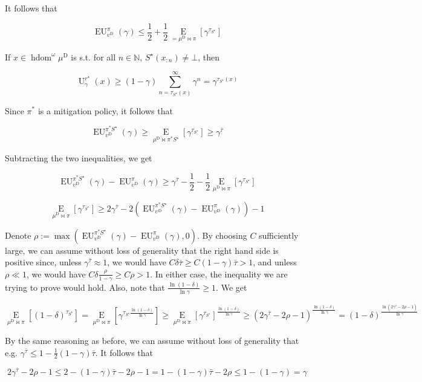 \documentclass[a4paper]{article}
\newcommand{\AP}[1]{\left(#1\right)}
\newcommand{\AB}[1]{\left[#1\right]}
\newcommand{\Ea}[2]{\underset{#1}{\operatorname{E}}\AB{#2}}
\newcommand{\Nats}{\mathbb{N}}
\DeclareMathOperator{\HD}{hdom}
\newcommand{\RMD}{\mathrm{D}}
\newcommand{\UD}{\upsilon^{\RMD}}
\newcommand{\Ut}{\operatorname{U}}
\newcommand{\EU}{\operatorname{EU}}
\begin{document}
It follows that

$$\EU_{\UD}^\pi(\gamma) \leq \frac{1}{2}+\frac{1}{2}\Ea{=\mu^\RMD\bowtie\pi}{\gamma^{\tau_{S^\star}}}$$

If $x \in \HD^\omega{\mu^\RMD}$ is s.t. for all $n\in\Nats$, $S^\star\AP{x_{:n}}\ne\bot$, then

$$\Ut^{r^\star}_\gamma(x) \geq (1-\gamma)\sum_{n=\tau_{S^\star}(x)}^\infty \gamma^n = \gamma^{\tau_{S^\star}(x)}$$

Since $\pi^*$ is a mitigation policy, it follows that

$$\EU_{\UD}^{\pi^*S^\star}(\gamma) \geq \Ea{\mu^\RMD\bowtie\pi^*S^\star}{\gamma^{\tau_{S^\star}}} \geq \gamma^{\bar{\tau}}$$

Subtracting the two inequalities, we get

$$\EU_{\UD}^{\pi^*S^\star}(\gamma) - \EU_{\UD}^\pi(\gamma) \geq \gamma^{\bar{\tau}} - \frac{1}{2} - \frac{1}{2}\Ea{\mu^\RMD\bowtie\pi}{\gamma^{\tau_{S^\star}}}$$

$$\Ea{\mu^\RMD\bowtie\pi}{\gamma^{\tau_{S^\star}}} \geq 2\gamma^{\bar{\tau}} - 2\AP{\EU_{\UD}^{\pi^*S^\star}(\gamma) - \EU_{\UD}^\pi(\gamma)}-1$$

Denote $\rho := \max\AP{\EU_{\UD}^{\pi^*S^\star}(\gamma) - \EU_{\UD}^\pi(\gamma),0}$.  By choosing $C$ sufficiently large, we can assume without loss of generality that the right hand side is positive since, unless $\gamma^{\bar{\tau}} \approx 1$, we would have $C\delta\bar{\tau} \geq C(1-\gamma)\bar{\tau} > 1$, and unless $\rho \ll 1$, we would have $C\delta\frac{\rho}{1-\gamma} \geq C\rho > 1$. In either case, the inequality we are trying to prove would hold. Also, note that $\frac{\ln{(1-\delta)}}{\ln{\gamma}} \geq 1$. We get

$$\Ea{\mu^\RMD\bowtie\pi}{(1-\delta)^{\tau_{S^\star}}}=\Ea{\mu^\RMD\bowtie\pi}{\gamma^{\tau_{S^\star}\frac{\ln{(1-\delta)}}{\ln{\gamma}}}} \geq \Ea{\mu^\RMD\bowtie\pi}{\gamma^{\tau_{S^\star}}}^{\frac{\ln{(1-\delta)}}{\ln{\gamma}}} \geq \AP{2\gamma^{\bar{\tau}}-2\rho-1}^{\frac{\ln{(1-\delta)}}{\ln{\gamma}}}=(1-\delta)^{\frac{\ln{\AP{2\gamma^{\bar{\tau}}-2\rho-1}}}{\ln{\gamma}}}$$

By the same reasoning as before, we can assume without loss of generality that e.g. $\gamma^{\bar{\tau}} \leq 1 - \frac{1}{2}(1-\gamma)\bar{\tau}$. It follows that

$$2\gamma^{\bar{\tau}}-2\rho-1 \leq 2 - (1 - \gamma)\bar{\tau} - 2\rho - 1 = 1 - (1 - \gamma)\bar{\tau} - 2\rho \leq 1 - (1-\gamma) = \gamma$$
\end{document}
